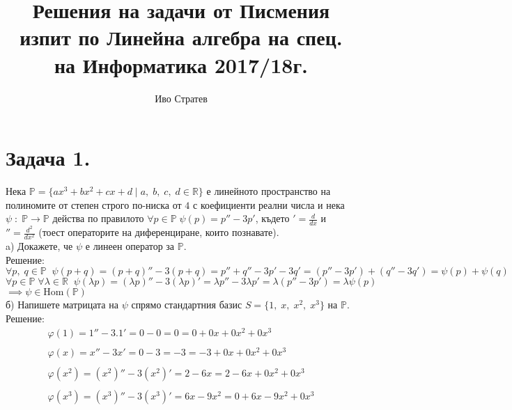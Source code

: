 \documentclass[12pt]{article}
\title{Решения на задачи от Писмения изпит по Линейна алгебра на спец. на Информатика 2017/18г.}
\author{Иво Стратев}
\newcommand{\R}{\mathbb{R}}
\begin{document}
\maketitle

\section*{Задача 1.}
Нека $\mathbb{P} = \{ax^3 + bx^2 + cx + d \; | \; a, \; b, \; c, \; d \in \R\}$ е линейното пространство на
полиномите от степен строго по-ниска от $4$ с коефициенти реални числа
и нека $\psi \; : \; \mathbb{P} \to \mathbb{P}$ действа по правилото $\forall p \in \mathbb{P} \; \psi(p) = p'' -3p'$,
където $' = \frac{d}{dx}$ и $'' = \frac{d^2}{dx^2}$ (тоест операторите на диференциране, които познавате). \\

a) Докажете, че $\psi$ е линеен оператор за $\mathbb{P}$. \\

Решение: \\

$\forall p, \; q \in \mathbb{P} \; \; \psi(p + q) = (p + q)'' -3(p + q) = p'' + q'' -3p' - 3q' = (p'' - 3p') + (q'' - 3q') = \psi(p) + \psi(q)$ \\

$\forall p \in \mathbb{P} \; \forall \lambda \in \R \; \; \psi(\lambda p) = (\lambda p)'' - 3(\lambda p)' = \lambda p'' - 3\lambda p' = \lambda(p'' - 3p') = \lambda\psi(p)$ \\

$\implies \psi \in \mathrm{Hom}(\mathbb{P})$ \\

б) Напишете матрицата на $\psi$ спрямо стандартния базис $S = \{1, \; x, \; x^2, \; x^3\}$ на $\mathbb{P}$. \\

Решение:
\begin{align*}
\varphi(1) = 1'' - 3.1' = 0 - 0 = 0 = 0 + 0x + 0x^2 + 0x^3 \\\\
\varphi(x) = x'' - 3x' = 0 - 3 = -3 = -3 + 0x + 0x^2 + 0x^3 \\\\
\varphi(x^2) = (x^2)'' - 3(x^2)' = 2 - 6x = 2 - 6x + 0x^2 + 0x^3 \\\\
\varphi(x^3) = (x^3)'' - 3(x^3)' = 6x - 9x^2 = 0 + 6x - 9x^2 + 0x^3
\end{align*} \\
\end{document}
